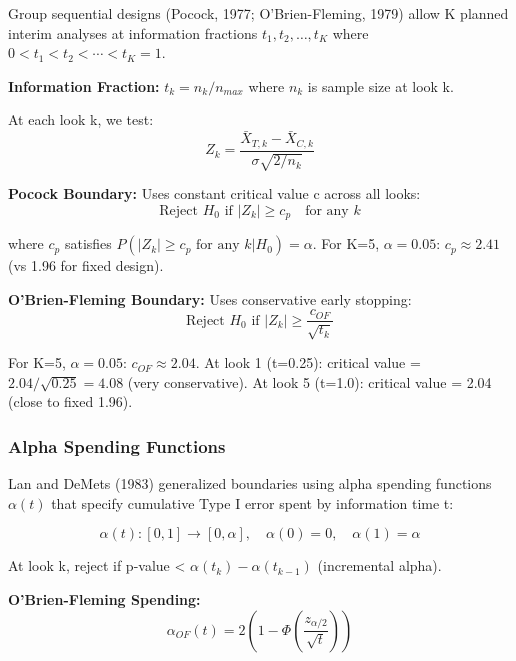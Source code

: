 Group sequential designs (Pocock, 1977; O'Brien-Fleming, 1979) allow K planned interim analyses at information fractions $t_1, t_2, \ldots, t_K$ where $0 < t_1 < t_2 < \cdots < t_K = 1$.

\textbf{Information Fraction:} $t_k = n_k / n_{max}$ where $n_k$ is sample size at look k.

At each look k, we test:
\begin{equation}
Z_k = \frac{\bar{X}_{T,k} - \bar{X}_{C,k}}{\sigma \sqrt{2/n_k}}
\end{equation}

\textbf{Pocock Boundary:} Uses constant critical value c across all looks:
\begin{equation}
\text{Reject } H_0 \text{ if } |Z_k| \geq c_p \quad \text{for any } k
\end{equation}

where $c_p$ satisfies $P(|Z_k| \geq c_p \text{ for any } k | H_0) = \alpha$. For K=5, $\alpha=0.05$: $c_p \approx 2.41$ (vs 1.96 for fixed design).

\textbf{O'Brien-Fleming Boundary:} Uses conservative early stopping:
\begin{equation}
\text{Reject } H_0 \text{ if } |Z_k| \geq \frac{c_{OF}}{\sqrt{t_k}}
\end{equation}

For K=5, $\alpha=0.05$: $c_{OF} \approx 2.04$. At look 1 (t=0.25): critical value = $2.04/\sqrt{0.25} = 4.08$ (very conservative). At look 5 (t=1.0): critical value = 2.04 (close to fixed 1.96).

\subsubsection{Alpha Spending Functions}

Lan and DeMets (1983) generalized boundaries using alpha spending functions $\alpha(t)$ that specify cumulative Type I error spent by information time t:

\begin{equation}
\alpha(t): [0, 1] \to [0, \alpha], \quad \alpha(0) = 0, \quad \alpha(1) = \alpha
\end{equation}

At look k, reject if p-value < $\alpha(t_k) - \alpha(t_{k-1})$ (incremental alpha).

\textbf{O'Brien-Fleming Spending:}
\begin{equation}
\alpha_{OF}(t) = 2\left(1 - \Phi\left(\frac{z_{\alpha/2}}{\sqrt{t}}\right)\right)
\end{equation}

